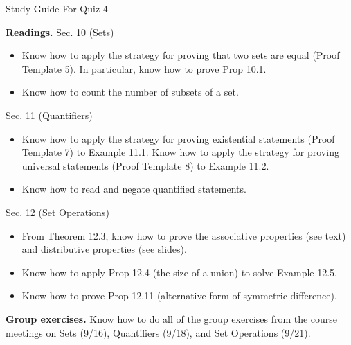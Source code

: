 \documentclass[10pt]{beamer}
\begin{document}
\begin{frame}{Study Guide For Quiz 4}
\footnotesize 


\colorbox{red!20}{\textbf{Readings.}} 
Sec. 10 (Sets)
\begin{itemize}
\item Know how to apply the strategy for proving that two sets are equal (Proof Template 5). In particular, know how to prove Prop 10.1.
\item Know how to count the number of subsets of a set.
\end{itemize}
Sec. 11 (Quantifiers)
\begin{itemize}
\item Know how to apply the strategy for proving existential statements (Proof Template 7) to Example 11.1. Know how to apply the strategy for proving universal statements (Proof Template 8) to Example 11.2.
\item Know how to read and negate quantified statements.
\end{itemize}
Sec. 12 (Set Operations)
\begin{itemize}
\item From Theorem 12.3, know how to prove the associative properties (see text) and distributive properties (see slides).
\item Know how to apply Prop 12.4 (the size of a union) to solve Example 12.5.
\item Know how to prove Prop 12.11 (alternative form of symmetric difference).
\end{itemize}


\vfill 
\colorbox{yellow!20}{\textbf{Group exercises.}} Know how to do all of the group exercises from the course meetings on Sets (9/16), Quantifiers (9/18), and Set Operations (9/21).


\end{frame}
\end{document}
